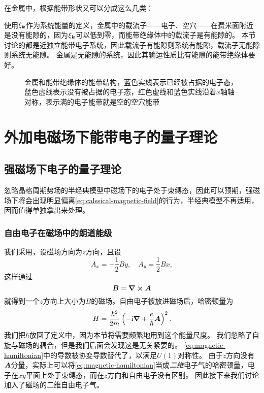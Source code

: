 在金属中，根据能带形状又可以分成这么几类：

使用$\xi_{\vb*{k}}$作为系统能量的定义，金属中的载流子——电子、空穴——在费米面附近是没有能隙的，因为$\xi_{\vb*{k}}$可以低到零，而能带绝缘体中的载流子是有能隙的。
本节讨论的都是近独立能带电子系统，因此载流子有能隙则系统有能隙，载流子无能隙则系统无能隙。
金属是无能隙的系统，因此其输运性质比有能隙的能带绝缘体要好。

\begin{figure}
    \centering
    \caption{金属和能带绝缘体的能带结构，蓝色实线表示已经被占据的电子态，蓝色虚线表示没有被占据的电子态，红色虚线和蓝色实线沿着$x$轴轴对称，表示满的电子能带就是空的空穴能带}
\end{figure}

\section{外加电磁场下能带电子的量子理论}

\subsection{强磁场下电子的量子理论}\label{sec:quantum-magnetic-field}

忽略晶格周期势场的半经典模型中磁场下的电子处于束缚态，因此可以预期，强磁场下将会出现明显偏离\eqref{eq:calssical-magnetic-field}的行为，半经典模型不再适用，因而值得单独拿出来处理。

\subsubsection{自由电子在磁场中的朗道能级}

我们采用，设磁场方向为$z$方向，且设
\begin{equation}
    A_x = - \frac{1}{2} B y, \quad A_y = \frac{1}{2} B x,
\end{equation}
这样通过
\[
    \vb*{B} = \curl{\vb*{A}}
\]
就得到一个$z$方向上大小为$B$的磁场。自由电子被放进磁场后，哈密顿量为
\begin{equation}
    {H} = \frac{\hbar^2}{2m} \left( - \mathrm{i} \grad + \frac{e}{\hbar} \vb*{A} \right)^2.
    \label{eq:magnetic-hamiltonian}
\end{equation}
我们把$\hbar$放回了定义中，因为本节将需要频繁地用到这个能量尺度。
我们忽略了自旋与磁场的耦合，但是我们后面会发现这是无关紧要的。
\eqref{eq:magnetic-hamiltonian}中的导数被协变导数替代了，以满足$U(1)$对称性。
由于$z$方向没有$\vb*{A}$分量，实际上可以将\eqref{eq:magnetic-hamiltonian}当成\emph{二维}电子气的哈密顿量，电子在$xy$平面上处于束缚态，而在$z$方向和自由电子没有区别。
因此接下来我们讨论加入了磁场的二维自由电子气。

